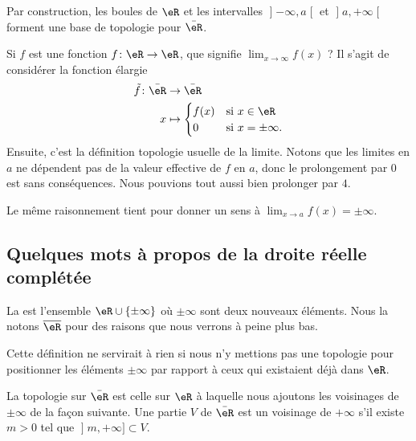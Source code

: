 Par construction, les boules de \( \eR\) et les intervalles \( \mathopen] -\infty , a \mathclose[\) et \( \mathopen] a , +\infty \mathclose[\) forment une base de topologie pour \( \bar \eR\).

Si \( f\) est une fonction \( f\colon \eR\to \eR\), que signifie \( \lim_{x\to \infty} f(x)\) ? Il s'agit de considérer la fonction élargie
\begin{equation}
    \begin{aligned}
        \tilde f\colon \bar \eR&\to \bar\eR \\
        x&\mapsto \begin{cases}
            f(x)    &   \text{si } x\in \eR\\
            0    &    \text{si } x=\pm\infty.
        \end{cases}
    \end{aligned}
\end{equation}
Ensuite, c'est la définition topologie usuelle de la limite. Notons que les limites en \( a\) ne dépendent pas de la valeur effective de \( f\) en \( a\), donc le prolongement par \( 0\) est sans conséquences. Nous pouvions tout aussi bien prolonger par \( 4\).

Le même raisonnement tient pour donner un sens à \( \lim_{x\to a} f(x)=\pm \infty\).

\subsection{Quelques mots à propos de la droite réelle complétée} 

\begin{definition}
    La  est l'ensemble \( \eR\cup\{ \pm \infty \}\) où \( \pm\infty\) sont deux nouveaux éléments. Nous la notons \( \overline{ \eR }\) pour des raisons que nous verrons à peine plus bas.
\end{definition}

Cette définition ne servirait à rien si nous n'y mettions pas une topologie pour positionner les éléments \( \pm\infty\) par rapport à ceux qui existaient déjà dans \( \eR\).

\begin{definition}
La topologie sur \(\bar \eR\) est celle sur \( \eR\) à laquelle nous ajoutons les voisinages de \( \pm\infty\) de la façon suivante. Une partie \( V\) de \( \bar \eR\) est un voisinage de \( +\infty\) s'il existe \( m>0\) tel que \( \mathopen] m , +\infty \mathclose]\subset V\).
\end{definition}

